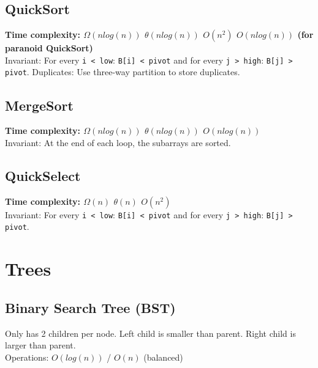\documentclass[10pt,landscape,a4paper]{article}
\begin{document}
\begin{multicols*}{4}

\subsection{QuickSort}
\textbf{Time complexity: $\Omega({nlog(n)})$ $\theta(nlog(n))$ $O(n^2)$ $O(nlog(n))$ (for paranoid QuickSort)}  \\
Invariant: For every \texttt{i < low}: \texttt{B[i] < pivot} and for every \texttt{j > high}: \texttt{B[j] > pivot}.
Duplicates: Use three-way partition to store duplicates.

\subsection{MergeSort}
\textbf{Time complexity: $\Omega({nlog(n)})$ $\theta(nlog(n))$ $O(nlog(n))$} \\
Invariant: At the end of each loop, the subarrays are sorted.

\subsection{QuickSelect}
\textbf{Time complexity: $\Omega(n)$ $\theta(n)$ $O(n^2)$} \\ 
Invariant: For every \texttt{i < low}: \texttt{B[i] < pivot} and for every \texttt{j > high}: \texttt{B[j] > pivot}.




\section{Trees}

\subsection{Binary Search Tree (BST)}
Only has 2 children per node. Left child is smaller than parent. Right child is larger than parent. \\
Operations: $O(log(n))$ / $O(n)$ (balanced)


\end{multicols*}
\end{document}
